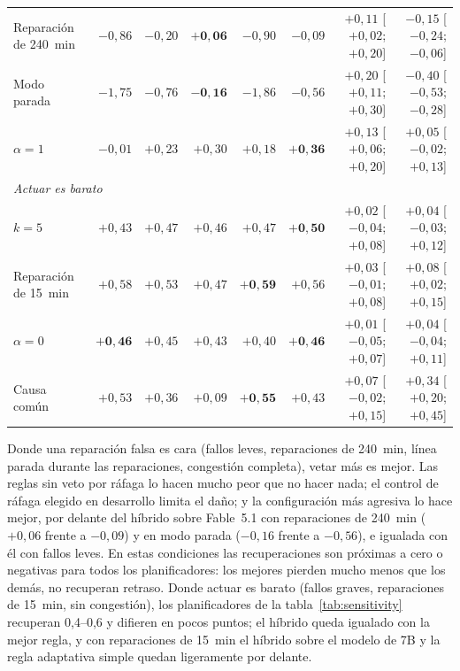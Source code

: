 \documentclass[preprint,11pt]{elsarticle}
\begin{document}
\begin{table}[t]
{\begin{tabular}{lrrrrrrr}
Reparación de 240~min & $-0{,}86$ & $-0{,}20$ & $\mathbf{+0{,}06}$ & $-0{,}90$ & $-0{,}09$ & $+0{,}11$ [$+0{,}02$; $+0{,}20$] & $-0{,}15$ [$-0{,}24$; $-0{,}06$] \\
Modo parada & $-1{,}75$ & $-0{,}76$ & $\mathbf{-0{,}16}$ & $-1{,}86$ & $-0{,}56$ & $+0{,}20$ [$+0{,}11$; $+0{,}30$] & $-0{,}40$ [$-0{,}53$; $-0{,}28$] \\
$\alpha = 1$ & $-0{,}01$ & $+0{,}23$ & $+0{,}30$ & $+0{,}18$ & $\mathbf{+0{,}36}$ & $+0{,}13$ [$+0{,}06$; $+0{,}20$] & $+0{,}05$ [$-0{,}02$; $+0{,}13$] \\
\multicolumn{8}{l}{\emph{Actuar es barato}} \\
$k = 5$ & $+0{,}43$ & $+0{,}47$ & $+0{,}46$ & $+0{,}47$ & $\mathbf{+0{,}50}$ & $+0{,}02$ [$-0{,}04$; $+0{,}08$] & $+0{,}04$ [$-0{,}03$; $+0{,}12$] \\
Reparación de 15~min & $+0{,}58$ & $+0{,}53$ & $+0{,}47$ & $\mathbf{+0{,}59}$ & $+0{,}56$ & $+0{,}03$ [$-0{,}01$; $+0{,}08$] & $+0{,}08$ [$+0{,}02$; $+0{,}15$] \\
$\alpha = 0$ & $\mathbf{+0{,}46}$ & $+0{,}45$ & $+0{,}43$ & $+0{,}40$ & $\mathbf{+0{,}46}$ & $+0{,}01$ [$-0{,}05$; $+0{,}07$] & $+0{,}04$ [$-0{,}04$; $+0{,}11$] \\
\midrule
Causa común & $+0{,}53$ & $+0{,}36$ & $+0{,}09$ & $\mathbf{+0{,}55}$ & $+0{,}43$ & $+0{,}07$ [$-0{,}02$; $+0{,}15$] & $+0{,}34$ [$+0{,}20$; $+0{,}45$] \\
\bottomrule
\end{tabular}}
\end{table}

Donde una reparación falsa es cara (fallos leves, reparaciones de 240~min, línea parada durante las reparaciones, congestión completa), vetar más es mejor. Las reglas sin veto por ráfaga lo hacen mucho peor que no hacer nada; el control de ráfaga elegido en desarrollo limita el daño; y la configuración más agresiva lo hace mejor, por delante del híbrido sobre Fable~5.1 con reparaciones de 240~min ($+0{,}06$ frente a $-0{,}09$) y en modo parada ($-0{,}16$ frente a $-0{,}56$), e igualada con él con fallos leves. En estas condiciones las recuperaciones son próximas a cero o negativas para todos los planificadores: los mejores pierden mucho menos que los demás, no recuperan retraso. Donde actuar es barato (fallos graves, reparaciones de 15~min, sin congestión), los planificadores de la tabla~\ref{tab:sensitivity} recuperan 0{,}4--0{,}6 y difieren en pocos puntos; el híbrido queda igualado con la mejor regla, y con reparaciones de 15~min el híbrido sobre el modelo de 7B y la regla adaptativa simple quedan ligeramente por delante.
\end{document}
